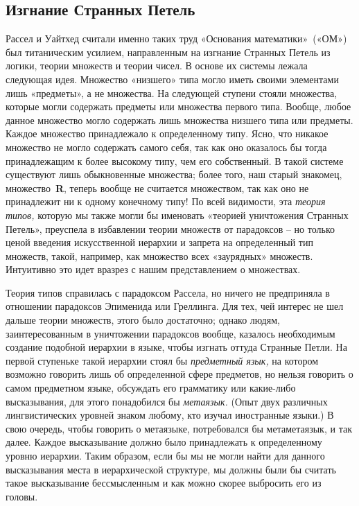 \documentclass[../main.tex]{subfiles}
\begin{document}
\subsection{Изгнание Странных Петель}

Рассел и Уайтхед считали именно таких труд «Основания математики»~(«ОМ») был титаническим усилием, направленным на изгнание Странных Петель из логики, теории множеств и теории чисел. В основе их системы лежала следующая идея. Множество «низшего» типа могло иметь своими элементами лишь «предметы», а не множества. На следующей ступени стояли множества, которые могли содержать предметы или множества первого типа. Вообще, любое данное множество могло содержать лишь множества низшего типа или предметы. Каждое множество принадлежало к определенному типу. Ясно, что никакое множество не могло содержать самого себя, так как оно оказалось бы тогда принадлежащим к более высокому типу, чем его собственный. В такой системе существуют лишь обыкновенные множества; более того, наш старый знакомец, множество~\textbf{R}, теперь вообще не считается множеством, так как оно не принадлежит ни к одному конечному типу! По всей видимости, эта \emph{теория типов,} которую мы также могли бы именовать «теорией уничтожения Странных Петель», преуспела в избавлении теории множеств от парадоксов \--- но только ценой введения искусственной иерархии и запрета на определенный тип множеств, такой, например, как множество всех «заурядных» множеств. Интуитивно это идет вразрез с нашим представлением о множествах.

Теория типов справилась с парадоксом Рассела, но ничего не предприняла в отношении парадоксов Эпименида или Греллинга. Для тех, чей интерес не шел дальше теории множеств, этого было достаточно; однако людям, заинтересованным в уничтожении парадоксов вообще, казалось необходимым создание подобной иерархии в языке, чтобы изгнать оттуда Странные Петли. На первой ступеньке такой иерархии стоял бы \emph{предметный язык,} на котором возможно говорить лишь об определенной сфере предметов, но нельзя говорить о самом предметном языке, обсуждать его грамматику или какие-либо высказывания, для этого понадобился бы \emph{метаязык.} (Опыт двух различных лингвистических уровней знаком любому, кто изучал иностранные языки.) В свою очередь, что­бы говорить о метаязыке, потребовался бы метаметаязык, и так далее. Каждое высказывание должно было принадлежать к определенному уровню иерархии. Таким образом, если бы мы не могли найти для данного высказывания места в иерархической структуре, мы должны были бы считать такое высказывание бессмысленным и как можно скорее выбросить его из головы.
\end{document}
